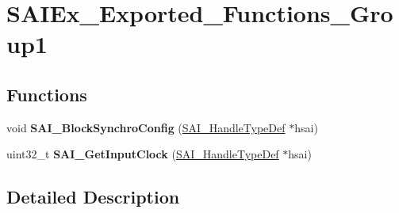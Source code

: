 \hypertarget{group___s_a_i_ex___exported___functions___group1}{}\section{S\+A\+I\+Ex\+\_\+\+Exported\+\_\+\+Functions\+\_\+\+Group1}
\label{group___s_a_i_ex___exported___functions___group1}
\subsection*{Functions}
\begin{DoxyCompactItemize}
\item 
void {\bfseries S\+A\+I\+\_\+\+Block\+Synchro\+Config} (\hyperlink{group___s_a_i___exported___types_gaf45214e5c90f73800130b3945bf45144}{S\+A\+I\+\_\+\+Handle\+Type\+Def} $\ast$hsai)\hypertarget{group___s_a_i_ex___exported___functions___group1_ga8df9d2737d763c8b3b238406aa577728}{}\label{group___s_a_i_ex___exported___functions___group1_ga8df9d2737d763c8b3b238406aa577728}

\item 
uint32\+\_\+t {\bfseries S\+A\+I\+\_\+\+Get\+Input\+Clock} (\hyperlink{group___s_a_i___exported___types_gaf45214e5c90f73800130b3945bf45144}{S\+A\+I\+\_\+\+Handle\+Type\+Def} $\ast$hsai)\hypertarget{group___s_a_i_ex___exported___functions___group1_gae1159f50ec7074166308171cb4096c15}{}\label{group___s_a_i_ex___exported___functions___group1_gae1159f50ec7074166308171cb4096c15}

\end{DoxyCompactItemize}


\subsection{Detailed Description}
